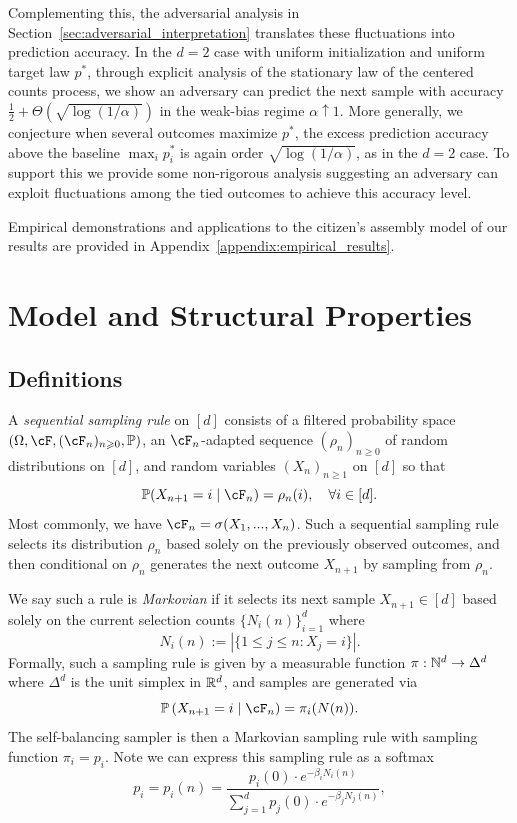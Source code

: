 Complementing this, the adversarial analysis in Section~\ref{sec:adversarial_interpretation}
translates these fluctuations into prediction accuracy. In the $d=2$ case with uniform initialization and uniform target law $p^*$, 
through explicit analysis of the stationary law of the centered counts process, we show an adversary
can predict the next sample with accuracy $\frac{1}{2} + \Theta(\sqrt{\log(1/\alpha)})$ in the weak-bias regime
$\alpha \uparrow 1$. More generally, we conjecture when several outcomes maximize $p^*$, the excess prediction accuracy
above the baseline $\max_i p_i^*$ is again order $\sqrt{\log(1/\alpha)}$, as in the $d=2$ case. To support this we provide some
non-rigorous analysis suggesting an adversary can exploit fluctuations among the tied outcomes to achieve this accuracy level.

Empirical demonstrations and applications to the citizen's assembly model of our results are
provided in Appendix~\ref{appendix:empirical_results}.

\section{Model and Structural Properties}
\label{sec:model_and_structural_properties}

\subsection{Definitions}

A \textit{sequential sampling rule} on $[d]$ consists of a filtered probability space $(\Omega, \cF, (\cF_n)_{n \geq 0}, \P)$, an $\cF_n$-adapted sequence $(\rho_n)_{n \geq 0}$ of random distributions on $[d]$, and random variables $(X_n)_{n \geq 1}$ on $[d]$ so that
%
    \[\P(X_{n+1} = i \mid \cF_n) = \rho_n(i), \quad \forall i \in [d]. \]
%
\noindent Most commonly, we have $\cF_n = \sigma(X_1,..., X_n)$. Such a sequential sampling rule selects its distribution $\rho_n$ based solely on the previously observed outcomes, and then conditional on $\rho_n$ generates the next outcome $X_{n+1}$ by sampling from $\rho_n$.

We say such a rule is \textit{Markovian} if it selects its next sample $X_{n+1} \in [d]$ based solely on the current selection counts $\{N_i(n)\}_{i=1}^d$ where
%
\[N_i(n) := |\{ 1 \leq j \leq n : X_j = i\}|.\]
%
\noindent  Formally, such a sampling rule is given by a measurable function $\pi:\mathbb{N}^d \to \Delta^d$ where $\Delta^d$ is the unit simplex in $\mathbb{R}^d$, and samples are generated via
%
\[\P\left(X_{n+1} = i \mid \cF_n\right) = \pi_i(N(n)).\]
%
\noindent The self-balancing sampler is then a Markovian sampling rule with sampling function $\pi_i = p_i$. Note we can express this sampling rule as a softmax
%
\begin{equation}
    p_i = p_i(n) = \frac{p_{i}(0) \cdot e^{-\beta_i N_{i}(n)}}{\sum_{j=1}^d p_{j}(0) \cdot e^{-\beta_j N_{j}(n) }},
    \label{eqn:self_balancing_sampler_transition_probs}
\end{equation}

